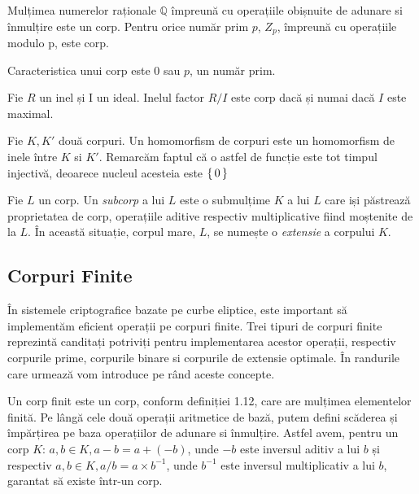 \begin{ex}
Mulțimea numerelor raționale $\mathbb{Q}$ împreună cu operațiile obișnuite de adunare si înmulțire este un corp. Pentru orice număr prim $p$, $Z_p$, împreună cu operațiile modulo p, este corp.  
\end{ex}

\begin{prop}
Caracteristica unui corp este $0$ sau $p$, un număr prim.
\end{prop}

\begin{prop}
Fie $R$ un inel și I un ideal. Inelul factor $R/I$ este corp dacă și numai dacă $I$ este maximal.
\end{prop}

\begin{dfn}
Fie $K, K'$ două corpuri. Un homomorfism de corpuri este un homomorfism de inele între $K$ si $K'$. Remarcăm faptul că o astfel de funcție este tot timpul injectivă, deoarece nucleul acesteia este $\set {0}$ 
\end{dfn}

\begin{dfn}
Fie $L$ un corp. Un \textit{subcorp} a lui $L$ este o submulțime $K$ a lui $L$ care iși păstrează proprietatea de corp, operațiile aditive respectiv multiplicative fiind moștenite de la $L$. În această situație, corpul mare, $L$, se numește o \textit{extensie} a corpului $K$.
\end{dfn}
\subsection{Corpuri Finite}
\label{subsec:subsec01}

În sistemele criptografice bazate pe curbe eliptice, este important să implementăm eficient operații pe corpuri finite. Trei tipuri de corpuri finite reprezintă canditați potriviți pentru implementarea acestor operații, respectiv corpurile prime, corpurile binare si corpurile de extensie optimale. În randurile care urmează vom introduce pe rând aceste concepte.

\begin{dfn}
Un corp finit este un corp, conform definiției 1.12, care are mulțimea elementelor finită. Pe lângă cele două operații aritmetice de bază, putem defini scăderea și împărțirea pe baza operațiilor de adunare si înmulțire. Astfel avem, pentru un corp $K$: $a, b\in K, a-b = a + (-b)$, unde $-b$ este inversul aditiv a lui $b$ și respectiv $a, b\in K, a/b = a \times b^{-1}$, unde $b^{-1}$ este inversul multiplicativ a lui $b$, garantat să existe într-un corp. 
\end{dfn}


